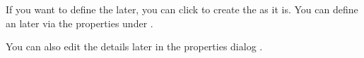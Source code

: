 If you want to define the \gdaut{} later, you can click  to create the \gdproject{} as it is. You can define an \gdaut{} later via the \gdproject{} properties under . 

You can also edit the \gdproject{} details later in the \gdproject{} properties dialog .
\clearpage



